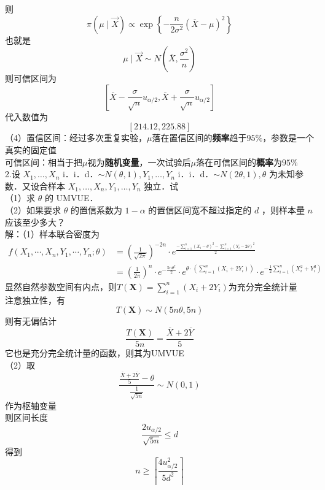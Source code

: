 \documentclass[UTF8,openany]{book}
\begin{document}
	则
	\[
	\pi(\mu \mid \vec{X})\propto \exp\left\{-\frac{n}{2\sigma^2}\left(\overline{X}-\mu \right)^2 \right\}
	\]
	也就是
	\[
	\mu \mid \vec{X}\sim N\left(\overline{X},\frac{\sigma^2}{n} \right) 
	\]
	则可信区间为
	\[
	\left[\overline{X}-\frac{\sigma}{\sqrt{n}} u_{\alpha / 2}, \overline{X}+\frac{\sigma}{\sqrt{n}} u_{\alpha / 2} \right] 
	\]
	代入数值为
	\[
	[214.12,225.88]
	\]
	（4）置信区间：经过多次重复实验，$\mu$落在置信区间的\textbf{频率}趋于$95\%$，参数是一个真实的固定值\\
	可信区间：相当于把$\mu$视为\textbf{随机变量}，一次试验后$\mu$落在可信区间的\textbf{概率}为$95\%$\\
	
	
	
	
	\noindent 2.设 $X_1, \ldots, X_n$ i．i．d．$\sim N(\theta, 1), Y_1, \ldots, Y_n$ i．i．d．$\sim N(2 \theta, 1), \theta$ 为未知参数．又设合样本 $X_1, \ldots, X_n, Y_1, \ldots, Y_n$ 独立．试\\
	（1）求 $\theta$ 的 UMVUE．\\
	（2）如果要求 $\theta$ 的置信系数为 $1-\alpha$ 的置信区间宽不超过指定的 $d$ ，则样本量 $n$应该至少多大？\\
	解：（1）样本联合密度为
	\[
	\begin{aligned}
		f\left(X_1, \cdots, X_n, Y_1, \cdots, Y_n ; \theta\right) 
		&=\left(\frac{1}{\sqrt{2 \pi}}\right)^{-2 n} \cdot e^{\frac{-\sum_{i=1}^n\left(X_i-\theta\right)^2-\sum_{i=1}^n\left(Y_i-2 \theta\right)^2}{2}} \\
		& =\left(\frac{1}{2 \pi}\right)^n \cdot e^{-\frac{5 n \theta^2}{2}} \cdot e^{ \theta \cdot\left(\sum_{i=1}^n\left(X_i+2 Y_i\right)\right)} \cdot e^{-\frac{1}{2} \sum_{i=1}^n\left(X_i^2+Y_i^2\right)}
	\end{aligned}
	\]
	显然自然参数空间有内点，则$T(\boldsymbol{X})=\sum\limits_{i=1}^n \left(X_i+2Y_i \right) $为充分完全统计量\\
	注意独立性，有
	\[
	T(\boldsymbol{X})\sim N(5n\theta,5n)
	\]
	则有无偏估计
	\[
	\frac{T(\boldsymbol{X})}{5n}=\frac{\overline{X}+2\overline{Y}}{5}
	\]
	它也是充分完全统计量的函数，则其为UMVUE\\
	（2）取
	\[
	\frac{\frac{\overline{X}+2\overline{Y}}{5}-\theta}{\frac{1}{\sqrt{5n}}} \sim N(0,1)
	\]
	作为枢轴变量\\
	则区间长度
	\[
	\frac{2u_{\alpha/2}}{\sqrt{5n}}\le d
	\]
	得到
	\[
	n \geq\left\lceil\frac{4 u_{\alpha/2}^2}{5 d^2}\right\rceil
	\]\\
	
	
	
\end{document}
